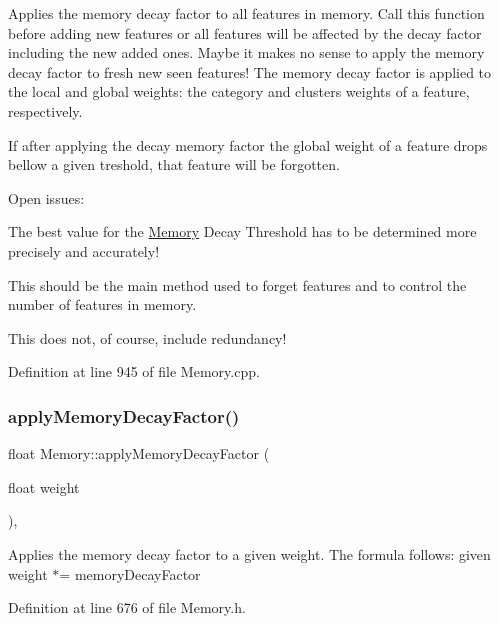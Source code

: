 Applies the memory decay factor to all features in memory. Call this function before adding new features or all features will be affected by the decay factor including the new added ones. Maybe it makes no sense to apply the memory decay factor to fresh new seen features! The memory decay factor is applied to the local and global weights\+: the category and clusters weights of a feature, respectively.

If after applying the decay memory factor the global weight of a feature drops bellow a given treshold, that feature will be forgotten.

Open issues\+:
\begin{DoxyItemize}
\item The best value for the \hyperlink{class_memory}{Memory} Decay Threshold has to be determined more precisely and accurately!
\end{DoxyItemize}

This should be the main method used to forget features and to control the number of features in memory.
\begin{DoxyItemize}
\item This does not, of course, include redundancy! 
\end{DoxyItemize}

Definition at line 945 of file Memory.\+cpp.

\mbox{\label{class_memory_ac31686018cb26f05d51714e057af954b}} 
\subsubsection{\texorpdfstring{apply\+Memory\+Decay\+Factor()}{applyMemoryDecayFactor()}}
{\footnotesize\ttfamily float Memory\+::apply\+Memory\+Decay\+Factor (\begin{DoxyParamCaption}\item[{float}]{weight }\end{DoxyParamCaption})\hspace{0.3cm}{\ttfamily [inline]}, {\ttfamily [protected]}}

Applies the memory decay factor to a given weight. The formula follows\+: given weight $\ast$= memory\+Decay\+Factor 

Definition at line 676 of file Memory.\+h.

\mbox{\label{class_memory_a90b1dfcf945ed2b899e8c67febb23300}} 
